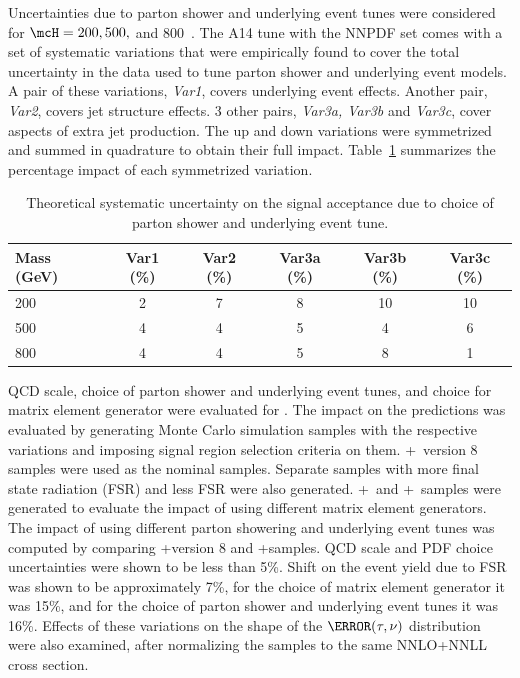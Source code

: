 \par Uncertainties due to parton shower and underlying event tunes were considered for 
$\mcH=200, 500,$ and 800~\GeV. The A14 tune with the NNPDF set comes with a set of 
systematic variations that were empirically found to cover the total uncertainty in the data used to 
tune parton shower and underlying event models. A pair of these variations, {\it Var1}, covers 
underlying event effects. Another pair, {\it Var2}, covers jet structure effects. 3 other pairs, {\it Var3a, Var3b} and 
{\it Var3c}, cover aspects of extra jet production. The up and down variations were symmetrized and summed in quadrature to obtain 
their full impact. Table~\ref{tab:systsPS} summarizes the percentage impact of each symmetrized variation. 

\begin{table}[!h]
\begin{center}
\begin{tabular}{|l|ccccc|}
\hline
Mass (GeV)  & Var1 (\%) & Var2 (\%)& Var3a (\%) & Var3b (\%) & Var3c (\%)  \\
\hline\hline
200 & 2 & 7 & 8 & 10 & 10 \\
500 & 4 & 4 & 5 & 4  & 6  \\
800 & 4 & 4 & 5 & 8 & 1 \\
\hline
\end{tabular}
\end{center}
\caption{Theoretical systematic uncertainty on the signal acceptance due to choice of parton shower and 
underlying event tune.}
\label{tab:systsPS}
\end{table}

\par QCD scale, choice of parton shower and underlying event tunes, and choice for matrix element generator 
were evaluated for \ttbar. The impact on the predictions was evaluated by generating Monte Carlo simulation samples    
with the respective variations and imposing signal region selection criteria on them. 
 \POWHEG+\PYTHIA\ version 8 
samples were used as the nominal samples. Separate samples with more final state radiation (FSR) and 
less FSR were also generated. \MGMCatNLO+\HERWIGPP\ and \POWHEG+\HERWIGPP\ samples 
were generated to evaluate the impact of using different matrix element generators.    
The impact of using different parton showering and underlying event tunes was computed 
by comparing \POWHEG+\PYTHIA version 8 and \POWHEG+\HERWIGPP samples. QCD scale and PDF choice 
uncertainties were shown to be less than 5\%. Shift on the event yield due to FSR was shown to be 
approximately 7\%, for the choice of matrix element generator it was 15\%, and for the choice of 
parton shower and underlying event tunes it was 16\%. Effects of these variations on the shape 
of the $\mT(\tau,\nu)$ distribution were also examined, after normalizing the samples to the same 
NNLO+NNLL cross section.%

